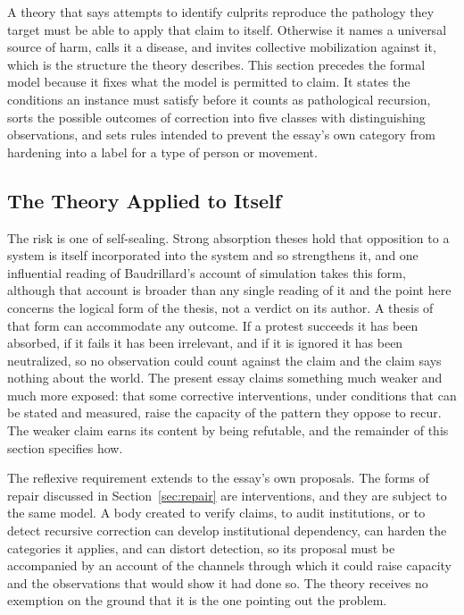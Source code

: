 \documentclass[12pt]{article}
\theoremstyle{remark}
\begin{document}
A theory that says attempts to identify culprits reproduce the pathology they target must be able to apply that claim to itself. Otherwise it names a universal source of harm, calls it a disease, and invites collective mobilization against it, which is the structure the theory describes. This section precedes the formal model because it fixes what the model is permitted to claim. It states the conditions an instance must satisfy before it counts as pathological recursion, sorts the possible outcomes of correction into five classes with distinguishing observations, and sets rules intended to prevent the essay's own category from hardening into a label for a type of person or movement.

\subsection{The Theory Applied to Itself}

The risk is one of self-sealing. Strong absorption theses hold that opposition to a system is itself incorporated into the system and so strengthens it, and one influential reading of Baudrillard's account of simulation \cite{baudrillard1994} takes this form, although that account is broader than any single reading of it and the point here concerns the logical form of the thesis, not a verdict on its author. A thesis of that form can accommodate any outcome. If a protest succeeds it has been absorbed, if it fails it has been irrelevant, and if it is ignored it has been neutralized, so no observation could count against the claim and the claim says nothing about the world. The present essay claims something much weaker and much more exposed: that some corrective interventions, under conditions that can be stated and measured, raise the capacity of the pattern they oppose to recur. The weaker claim earns its content by being refutable, and the remainder of this section specifies how.

The reflexive requirement extends to the essay's own proposals. The forms of repair discussed in Section~\ref{sec:repair} are interventions, and they are subject to the same model. A body created to verify claims, to audit institutions, or to detect recursive correction can develop institutional dependency, can harden the categories it applies, and can distort detection, so its proposal must be accompanied by an account of the channels through which it could raise capacity and the observations that would show it had done so. The theory receives no exemption on the ground that it is the one pointing out the problem.
\end{document}
